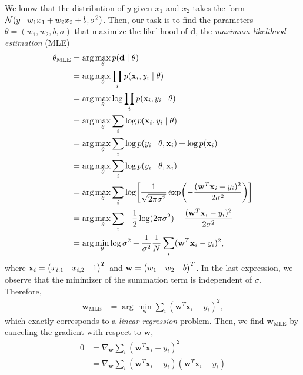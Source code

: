 \documentclass[11pt, a4paper]{exam}
\begin{document}
\begin{exercises}
\begin{parts}
    \begin{solution}
        \allowdisplaybreaks
        We know that the distribution of $y$ given $x_1$ and $x_2$ takes the form $\mathcal{N}(y \mid w_1 x_1 + w_2 x_2 + b, \sigma^2)$. Then, our task is to find the parameters $\theta = (w_1, w_2, b, \sigma)$ that maximize the likelihood of $\mathbf{d}$, \ie{} the \emph{maximum likelihood estimation} (MLE)
        \begin{align*}
            \theta_{\text{MLE}} & = \arg \max_\theta p(\mathbf{d} \mid \theta) \\
            & = \arg \max_\theta \prod_i p(\mathbf{x}_i, y_i \mid \theta) \\
            & = \arg \max_\theta \log \prod_i p(\mathbf{x}_i, y_i \mid \theta) \\
            & = \arg \max_\theta \sum_i \log p(\mathbf{x}_i, y_i \mid \theta) \\
            & = \arg \max_\theta \sum_i \log p(y_i \mid \theta, \mathbf{x}_i) + \log p(\mathbf{x}_i) \\
            & = \arg \max_\theta \sum_i \log p(y_i \mid \theta, \mathbf{x}_i) \\
            & = \arg \max_\theta \sum_i \log \sbk*{\frac{1}{\sqrt{2 \pi \sigma^2}} \exp\rbk*{- \frac{(\mathbf{w}^T \mathbf{x}_i - y_i)^2}{2 \sigma^2}}} \\
            & = \arg \max_\theta \sum_i - \frac{1}{2} \log (2 \pi \sigma^2) - \frac{(\mathbf{w}^T \mathbf{x}_i - y_i)^2}{2 \sigma^2} \\
            & = \arg \min_\theta \log \sigma^2 + \frac{1}{\sigma^2} \frac{1}{N} \sum_i (\mathbf{w}^T \mathbf{x}_i - y_i)^2 ,
        \end{align*}
        where $\mathbf{x}_i = \begin{pmatrix}x_{i,1} & x_{i,2} & 1\end{pmatrix}^T$ and $\mathbf{w} = \begin{pmatrix}w_1 & w_2 & b\end{pmatrix}^T$. In the last expression, we observe that the minimizer of the summation term is independent of $\sigma$. Therefore,
        \begin{align*}
            \mathbf{w}_{\text{MLE}} & = \arg \min_{\mathbf{w}} \sum_i (\mathbf{w}^T \mathbf{x}_i - y_i)^2 ,
        \end{align*}
        which exactly corresponds to a \emph{linear regression} problem. Then, we find $\mathbf{w}_{\text{MLE}}$ by canceling the gradient with respect to $\mathbf{w}$, \ie{}
        \begin{align*}
            0 & = \nabla_{\!\mathbf{w}} \sum_i (\mathbf{w}^T \mathbf{x}_i - y_i)^2 \\
            & = \nabla_{\!\mathbf{w}} \sum_i (\mathbf{w}^T \mathbf{x}_i - y_i) (\mathbf{w}^T \mathbf{x}_i - y_i) \\

\end{align*}
\end{solution}
\end{parts}
\end{exercises}
\end{document}
